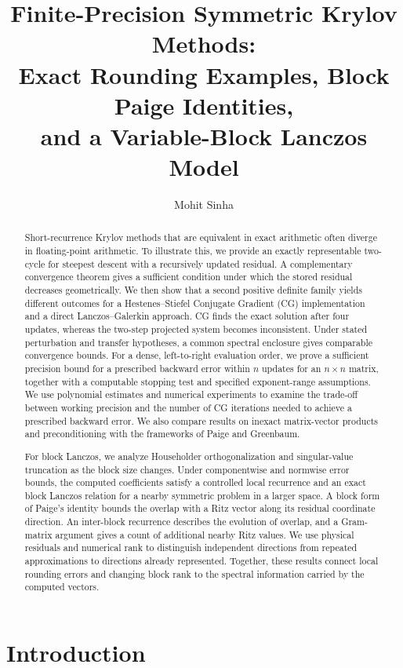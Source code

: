 \documentclass[11pt]{article}
\title{Finite-Precision Symmetric Krylov Methods:\\
Exact Rounding Examples, Block Paige Identities,\\
and a Variable-Block Lanczos Model}
\author{Mohit Sinha}
\date{}
\theoremstyle{definition}
\begin{document}
\maketitle

\begin{abstract}
Short-recurrence Krylov methods that are equivalent in exact arithmetic often
diverge in floating-point arithmetic. To illustrate this, we provide an exactly
representable two-cycle for steepest descent with a recursively updated
residual. A complementary convergence theorem gives a sufficient condition
under which the stored residual decreases geometrically. We then show that a
second positive definite family yields different outcomes for a Hestenes--Stiefel
Conjugate Gradient (CG) implementation and a direct Lanczos--Galerkin approach.
CG finds the exact solution after four updates, whereas the two-step projected
system becomes inconsistent. Under stated perturbation and transfer hypotheses,
a common spectral enclosure gives comparable convergence bounds. For a dense,
left-to-right evaluation order, we prove a sufficient precision bound for a
prescribed backward error within $n$ updates for an $n\times n$ matrix, together with a
computable stopping test and specified exponent-range assumptions. We use
polynomial estimates and numerical experiments to examine the trade-off
between working precision and the number of CG iterations needed to achieve
a prescribed backward error. We also compare results on inexact matrix-vector products and
preconditioning with the frameworks of Paige and Greenbaum.

For block Lanczos, we analyze Householder orthogonalization and singular-value
truncation as the block size changes. Under componentwise and normwise error
bounds, the computed coefficients satisfy a controlled local recurrence and an
exact block Lanczos relation for a nearby symmetric problem in a larger space.
A block form of Paige's identity bounds the overlap with a Ritz vector along
its residual coordinate direction. An inter-block recurrence describes the
evolution of overlap, and a Gram-matrix argument gives a count of additional
nearby Ritz values. We use physical residuals and numerical rank to distinguish
independent directions from repeated approximations to directions already
represented. Together, these results connect local rounding errors
and changing block rank to the spectral information carried by the computed
vectors.
\end{abstract}

\section{Introduction}
\label{sec:introduction}
\end{document}
